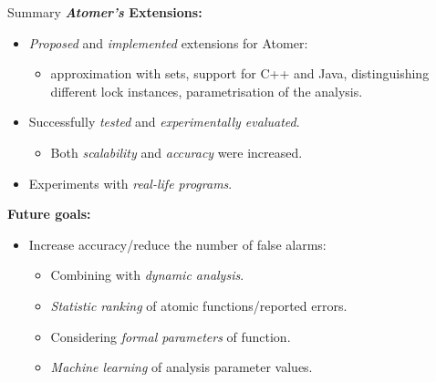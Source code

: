 \documentclass[10pt, xcolor=pdflatex, hyperref={unicode}, aspectratio=169]{beamer}
\begin{document}
\begin{frame}{Summary}
    \textbf{\emph{Atomer's} \alert{Extensions}:}
    \smallskip
    \begin{itemize}\setlength\itemsep{.8em}
        \item \emph{Proposed} and \emph{implemented} \alert{extensions for Atomer}:
            \smallskip
            \begin{itemize}
                \item approximation with sets, support for C++ and Java, distinguishing different lock instances, parametrisation of the analysis.
            \end{itemize}

        \item Successfully \emph{tested} and \emph{experimentally evaluated}.
            \smallskip
            \begin{itemize}
                \item Both \emph{scalability} and \emph{accuracy} were \alert{increased}.
            \end{itemize}

        \item Experiments with \emph{real-life programs}.
    \end{itemize}

    \medskip

    \textbf{Future goals:}
    \smallskip
    \begin{itemize}
        \item Increase \alert{accuracy}/reduce the number of \alert{false alarms}:
            \smallskip
            \begin{itemize}\setlength\itemsep{.5em}
                \item Combining with \emph{dynamic analysis}.

                \item \emph{Statistic ranking} of atomic functions/reported errors.

                \item Considering \emph{formal parameters} of function.

                \item \emph{Machine learning} of analysis parameter values.
            \end{itemize}
    \end{itemize}
\end{frame}


\end{document}
